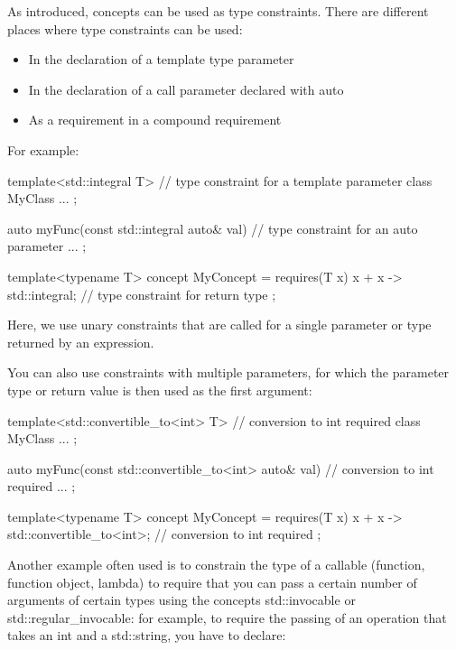 As introduced, concepts can be used as type constraints. There are different places where type constraints can be used:

\begin{itemize}
\item
In the declaration of a template type parameter

\item
In the declaration of a call parameter declared with auto

\item
As a requirement in a compound requirement
\end{itemize}

For example:

\begin{cpp}
template<std::integral T> // type constraint for a template parameter
class MyClass {
	...
};

auto myFunc(const std::integral auto& val) { // type constraint for an auto parameter
	...
};

template<typename T>
concept MyConcept = requires(T x) {
		{ x + x } -> std::integral; // type constraint for return type
	};
\end{cpp}

Here, we use unary constraints that are called for a single parameter or type returned by an expression.


You can also use constraints with multiple parameters, for which the parameter type or return value is then used as the first argument:

\begin{cpp}
template<std::convertible_to<int> T> // conversion to int required
class MyClass {
	...
};

auto myFunc(const std::convertible_to<int> auto& val) { // conversion to int required
	...
};

template<typename T>
concept MyConcept = requires(T x) {
		{ x + x } -> std::convertible_to<int>; // conversion to int required
	};
\end{cpp}

Another example often used is to constrain the type of a callable (function, function object, lambda) to require that you can pass a certain number of arguments of certain types using the concepts std::invocable or std::regular\_invocable: for example, to require the passing of an operation that takes an int and a std::string, you have to declare:

